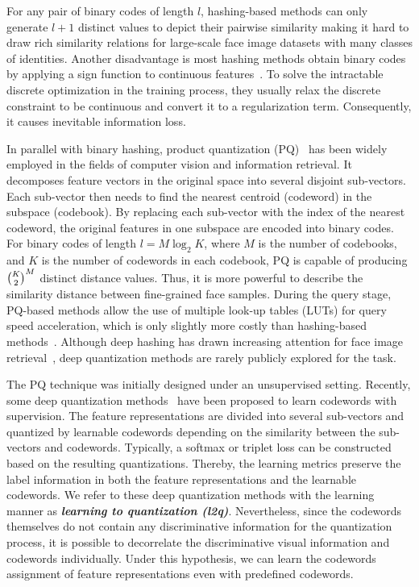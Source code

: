 \documentclass{elsarticle}
\begin{document}
For any pair of binary codes of length $l$, hashing-based methods can only generate $l+1$ distinct values to depict their pairwise similarity making it hard to draw rich similarity relations for large-scale face image datasets with many classes of identities. Another disadvantage is most hashing methods obtain binary codes by applying a sign function to continuous features~\cite{li2017deep,lin2017discriminative}. To solve the intractable discrete optimization in the training process, they usually relax the discrete constraint to be continuous and convert it to a regularization term. Consequently, it causes inevitable information loss. 

In parallel with binary hashing, product quantization (PQ)~\cite{jegou2010product, ge2013optimized, zhang2014composite} has been widely employed in the fields of computer vision and information retrieval. It decomposes feature vectors in the original space into several disjoint sub-vectors. Each sub-vector then needs to find the nearest centroid (codeword) in the subspace (codebook). By replacing each sub-vector with the index of the nearest codeword, the original features in one subspace are encoded into binary codes. For binary codes of length $l=M \log_2 K$, where $M$ is the number of codebooks, and $K$ is the number of codewords in each codebook, PQ is capable of producing $\tbinom{K}{2}^M$ distinct distance values. Thus, it is more powerful to describe the similarity distance between fine-grained face samples. During the query stage, PQ-based methods allow the use of multiple look-up tables (LUTs) for query speed acceleration, which is only slightly more costly than hashing-based methods~\cite{jegou2010product, cao2016deep}. Although deep hashing has drawn increasing attention for face image retrieval~\cite{tang2018supervised,tang2018discriminative,zhang2021deep}, deep quantization methods are rarely publicly explored for the task.

The PQ technique was initially designed under an unsupervised setting. 
Recently, some deep quantization methods~\cite{yu2018product,klein2019end} have been proposed to learn codewords with supervision. The feature representations are divided into several sub-vectors and quantized by learnable codewords depending on the similarity between the sub-vectors and codewords. Typically, a softmax or triplet loss can be constructed based on the resulting quantizations. Thereby, the learning metrics preserve the label information in both the feature representations and the learnable codewords. We refer to these deep quantization methods with the learning manner as \textit{\textbf{learning to quantization (l2q)}}. Nevertheless, since the codewords themselves do not contain any discriminative information for the quantization process, it is possible to decorrelate the discriminative visual information and codewords individually. Under this hypothesis, we can learn the codewords assignment of feature representations even with predefined codewords. 
\end{document}
